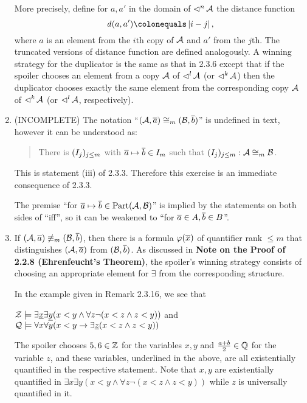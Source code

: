 \begin{enumerate}[1.]
More precisely, define for $a, a'$ in the domain of $\mathop{\lhd}^n \mathcal{A}$ the distance function
\[
\dist(a, a') \defas \abs{i - j},
\]
where $a$ is an element from the $i$th copy of $\mathcal{A}$ and $a'$ from the $j$th. The truncated versions of distance function are defined analogously. A winning strategy for the duplicator is the same as that in 2.3.6 except that if the spoiler chooses an element from a copy $\mathcal{A}$ of $\mathop{\lhd}^l \mathcal{A}$ (or $\mathop{\lhd}^k \mathcal{A}$) then the duplicator chooses exactly the same element from the corresponding copy $\mathcal{A}$ of $\mathop{\lhd}^k \mathcal{A}$ (or $\mathop{\lhd}^l \mathcal{A}$, respectively).
%
\item {} (INCOMPLETE)
The notation ``$(\mathcal{A}, \overline{a}) \cong_m (\mathcal{B}, \overline{b})$'' is undefined in text, however it can be understood as:
\begin{quote}
There is $(I_j)_{j \leq m}$ with $\overline{a} \mapsto \overline{b} \in I_m$ such that $(I_j)_{j \leq m} : \mathcal{A} \cong_m \mathcal{B}$.
\end{quote}
This is statement (iii) of 2.3.3. Therefore this exercise is an immediate consequence of 2.3.3.
\begin{remark}
The premise ``for $\overline{a} \mapsto \overline{b} \in \mathrm{Part}(\mathcal{A}, \mathcal{B})$'' is implied by the statements on both sides of ``iff'', so it can be weakened to ``for $\overline{a} \in A, \overline{b} \in B$''.
\end{remark}
%
\item {} If $(\mathcal{A}, \overline{a}) \not\equiv_m (\mathcal{B}, \overline{b})$, then there is a formula $\varphi(\overline{x})$ of quantifier rank $\leq m$ that distinguishes $(\mathcal{A}, \overline{a})$ from $(\mathcal{B}, \overline{b})$. As discussed in \textbf{Note on the Proof of 2.2.8 (Ehrenfeucht’s Theorem)}, the spoiler's winning strategy consists of choosing an appropriate element for $\exists$ from the corresponding structure.

In the example given in Remark 2.3.16, we see that
\begin{center}
$\mathcal{Z} \models \exists \underline{x} \exists \underline{y} (x < y \land \forall z \neg (x < z \land z < y))$ \hspace{1em} and \hspace{1em} $\mathcal{Q} \models \forall x \forall y (x < y \rightarrow \exists \underline{z} (x < z \land z < y))$
\end{center}
The spoiler chooses $5, 6 \in \mathbb{Z}$ for the variables $x, y$ and $\frac{a + b}{2} \in \mathbb{Q}$ for the variable $z$, and these variables, underlined in the above, are all existentially quantified in the respective statement. Note that $x, y$ are existentially quantified in $\exists x \exists y (x < y \land \forall z \neg (x < z \land z < y))$ while $z$ is universally quantified in it.


\end{enumerate}
